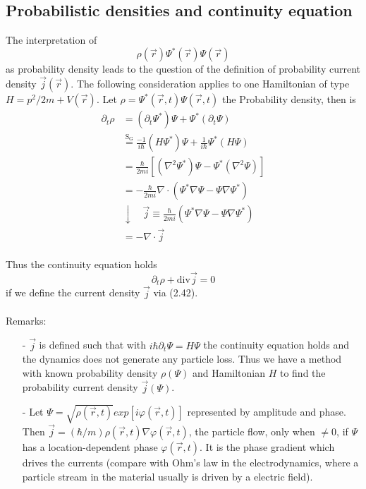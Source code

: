 \subsection{Probabilistic densities and continuity equation}
The interpretation of
\begin{equation}
    \rho(\vec{r})\Psi^*(\vec{r})\Psi(\vec{r})
\end{equation}
as probability density leads to the question of the definition of probability current density $\vec{j}(\vec{r})$. The following consideration applies to one Hamiltonian of type $H=p^2/2m+V(\vec{r})$. Let $\rho=\Psi^*(\vec{r},t)\Psi(\vec{r},t)$ the
Probability density, then is
\begin{equation}
\begin{aligned} \partial_{t} \rho &=\left(\partial_{t} \Psi^{*}\right) \Psi+\Psi^{*}\left(\partial_{t} \Psi\right) \\ & \stackrel{\mathrm{S}_{\mathrm{G}}}{=} \frac{-1}{i \hbar}\left(H \Psi^{*}\right) \Psi+\frac{1}{i \hbar} \Psi^{*}(H \Psi) \\ &=\frac{\hbar}{2 m i}\left[\left(\nabla^{2} \Psi^{*}\right) \Psi-\Psi^{*}\left(\nabla^{2} \Psi\right)\right] \\
&=-\frac{\hbar}{2 m i} \nabla \cdot\left(\Psi^{*} \nabla \Psi-\Psi \nabla \Psi^{*}\right) \\ &\downarrow \quad \vec{j} \equiv \frac{\hbar}{2 m i}\left(\Psi^{*} \nabla \Psi-\Psi \nabla \Psi^{*}\right) \\ &=-\nabla \cdot \vec{j}\end{aligned}
\end{equation}
\\
Thus the continuity equation holds
\begin{equation}
    \partial_t\rho+\text{div}\vec{j}=0
\end{equation}
if we define the current density $\vec{j}$ via (2.42).\\\\
Remarks: 
\begin{itemize}
    \item[-] $\vec{j}$ is defined such that with $i\hbar\partial_t\Psi=H\Psi$ the continuity equation holds and the dynamics does not generate any particle loss. Thus we have a method with known probability density $\rho(\Psi)$ and Hamiltonian $H$ to find the probability current density $\vec{j}(\Psi)$.
    \item[-] Let $\Psi=\sqrt{\rho(\vec{r},t)}exp[i\varphi(\vec{r},t)]$ represented by amplitude and phase. Then $\vec{j}=(\hbar/m)\rho(\vec{r},t)\nabla\varphi(\vec{r},t)$, the particle flow, only when $\neq 0$, if $\Psi$ has a location-dependent phase $\varphi(\vec{r},t)$. It is the phase gradient which drives the currents (compare with Ohm's law in the electrodynamics, where a particle stream in the material usually is driven by a electric field).
\end{itemize}
 
